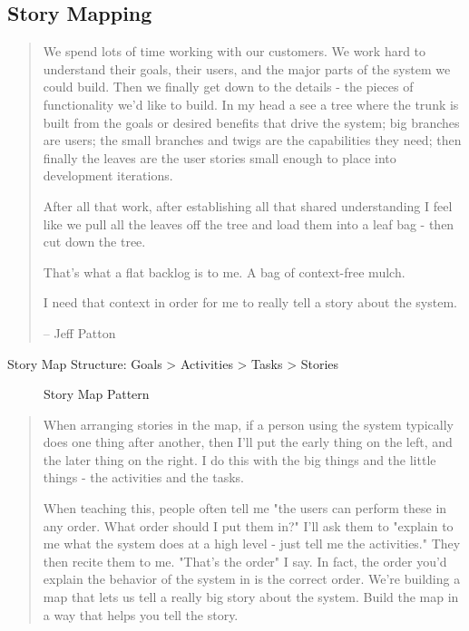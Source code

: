 \subsection{Story Mapping}
\blockquote{We spend lots of time working with our customers. We work hard to understand their goals, their users, and the major parts of the system we could build. Then we finally get down to the details - the pieces of functionality we'd like to build. In my head a see a tree where the trunk is built from the goals or desired benefits that drive the system; big branches are users; the small branches and twigs are the capabilities they need; then finally the leaves are the user stories small enough to place into development iterations.

After all that work, after establishing all that shared understanding I feel like we pull all the leaves off the tree and load them into a leaf bag - then cut down the tree.

That's what a flat backlog is to me. A bag of context-free mulch.

I need that context in order for me to really tell a story about the system.

-- Jeff Patton
}

Story Map Structure: Goals > Activities > Tasks > Stories

\begin{figure}[H] %
\caption{Story Map Pattern}
\label{fig:re:storymap}
\end{figure}

\blockquote{When arranging stories in the map, if a person using the system typically does one thing after another, then I'll put the early thing on the left, and the later thing on the right. I do this with the big things and the little things - the activities and the tasks.

When teaching this, people often tell me "the users can perform these in any order. What order should I put them in?" I'll ask them to "explain to me what the system does at a high level - just tell me the activities." They then recite them to me. "That's the order" I say. In fact, the order you'd explain the behavior of the system in is the correct order. We're building a map that lets us tell a really big story about the system. Build the map in a way that helps you tell the story.}

